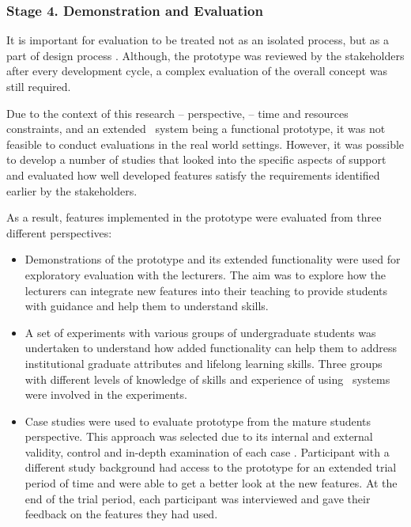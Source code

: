 \subsubsection{Stage 4. Demonstration and Evaluation}

It is important for evaluation to be treated not as an isolated process, but as
a part of design process \citep{Cleven2009}. Although, the prototype was
reviewed by the stakeholders after every development cycle, a complex evaluation
of the overall concept was still required.

Due to the context of this research -- \LLLs perspective, -- time and resources
constraints, and an extended \ep~system being a functional prototype, it was not 
feasible to conduct evaluations in the real world settings. However, it was
possible to develop a number of studies that looked into the specific aspects of
\LLLs support and evaluated how well developed features satisfy the requirements 
identified earlier by the stakeholders.
 
As a result, features implemented in the prototype were evaluated from three
different perspectives: 

\begin{itemize}
  \item Demonstrations of the prototype and its extended functionality were used
  for exploratory evaluation with the lecturers. The aim was to explore how the
  lecturers can integrate new features into their teaching to provide students
  with guidance and help them to understand \LLLs skills.
  
  \item A set of experiments with various groups of undergraduate students was
  undertaken to understand how added functionality can help them to address
  institutional graduate attributes and lifelong learning skills. Three groups
  with different levels of knowledge of \LLLs skills and experience of using
  \ep~systems were involved in the experiments.

  \item Case studies were used to evaluate prototype from the mature students
  perspective. This approach was selected due to its internal and external
  validity, control and in-depth examination of each case \citep{Yin2009}.
  Participant with a different study background had access to the prototype for
  an extended trial period of time and were able to get a better look at the new
  features. At the end of the trial period, each participant was interviewed and
  gave their feedback on the features they had used.
  
\end{itemize}

